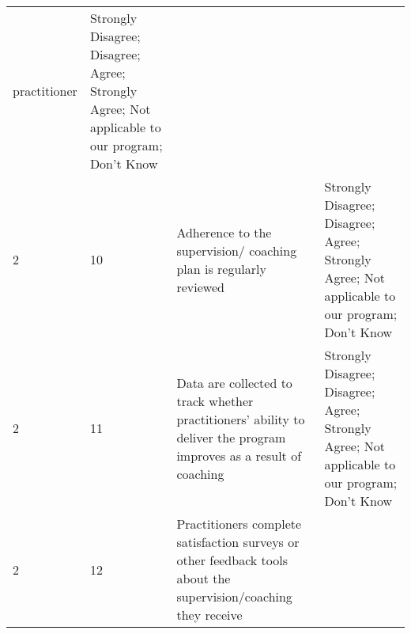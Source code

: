 \documentclass[]{article}
\begin{document}
\begin{longtable}[]{@{}llll@{}}
\begin{minipage}[t]{0.41\columnwidth}
practitioner\strut
\end{minipage} & \begin{minipage}[t]{0.39\columnwidth}\raggedright\strut
Strongly Disagree; Disagree; Agree; Strongly Agree; Not applicable to
our program; Don't Know\strut
\end{minipage}\tabularnewline
\begin{minipage}[t]{0.05\columnwidth}\raggedright\strut
2\strut
\end{minipage} & \begin{minipage}[t]{0.04\columnwidth}\raggedright\strut
10\strut
\end{minipage} & \begin{minipage}[t]{0.41\columnwidth}\raggedright\strut
Adherence to the supervision/ coaching plan is regularly reviewed\strut
\end{minipage} & \begin{minipage}[t]{0.39\columnwidth}\raggedright\strut
Strongly Disagree; Disagree; Agree; Strongly Agree; Not applicable to
our program; Don't Know\strut
\end{minipage}\tabularnewline
\begin{minipage}[t]{0.05\columnwidth}\raggedright\strut
2\strut
\end{minipage} & \begin{minipage}[t]{0.04\columnwidth}\raggedright\strut
11\strut
\end{minipage} & \begin{minipage}[t]{0.41\columnwidth}\raggedright\strut
Data are collected to track whether practitioners' ability to deliver
the program improves as a result of coaching\strut
\end{minipage} & \begin{minipage}[t]{0.39\columnwidth}\raggedright\strut
Strongly Disagree; Disagree; Agree; Strongly Agree; Not applicable to
our program; Don't Know\strut
\end{minipage}\tabularnewline
\begin{minipage}[t]{0.05\columnwidth}\raggedright\strut
2\strut
\end{minipage} & \begin{minipage}[t]{0.04\columnwidth}\raggedright\strut
12\strut
\end{minipage} & \begin{minipage}[t]{0.41\columnwidth}\raggedright\strut
Practitioners complete satisfaction surveys or other feedback tools
about the supervision/coaching they receive\strut
\end{minipage} & \begin{minipage}[t]{0.39\columnwidth}\raggedright\strut

\end{minipage}
\end{longtable}
\end{document}
